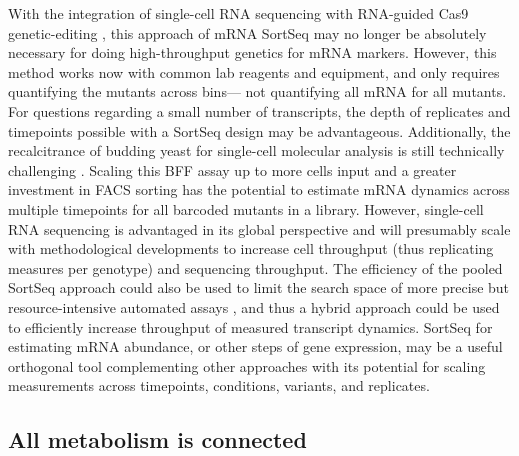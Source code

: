 With the integration of single-cell RNA sequencing with 
RNA-guided Cas9 genetic-editing 
\parencite{dixit2016perturb,hill2018design},
this approach of mRNA SortSeq may no longer be absolutely
necessary for doing high-throughput genetics for mRNA markers. 
However, this method works now with common lab reagents and equipment, 
and only requires quantifying the mutants across bins---
not quantifying all mRNA for all mutants.
For questions regarding a small number of transcripts,
the depth of replicates and timepoints possible with a SortSeq
design may be advantageous.
Additionally, the recalcitrance of budding yeast for 
single-cell molecular analysis is still technically challenging
\parencite{gasch2017single}.
Scaling this BFF assay up to more cells input and a greater investment
in FACS sorting \parencite{de2017deciphering} has the potential to 
estimate mRNA dynamics across multiple
timepoints for all barcoded mutants in a library.
However, single-cell RNA sequencing is advantaged in its global 
perspective and will presumably scale with methodological 
developments to increase cell throughput 
(thus replicating measures per genotype)
and sequencing throughput.
The efficiency of the pooled SortSeq approach could also be used to 
limit the search space of more precise but resource-intensive 
automated assays \parencite{worley2016genome}, 
and thus a hybrid approach could be used to
efficiently increase throughput of measured transcript dynamics. 
SortSeq for estimating mRNA abundance, or other steps of gene
expression, may be a useful orthogonal tool complementing
other approaches with its potential for scaling measurements across
timepoints, conditions, variants, and replicates.

\subsection{All metabolism is connected}

